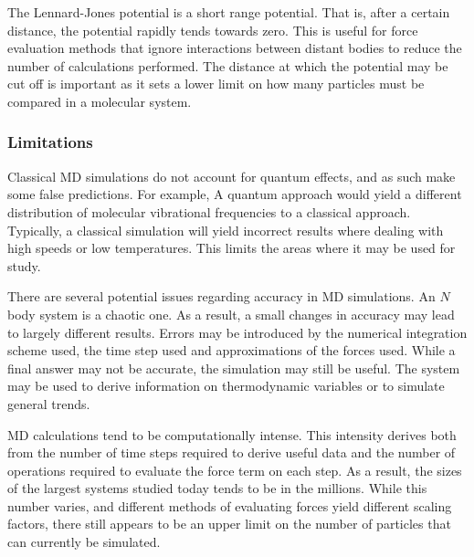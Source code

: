 The Lennard-Jones potential is a short range potential.
%
That is, after a certain distance,
the potential rapidly tends towards zero.
%
This is useful for force evaluation methods that
ignore interactions between distant bodies to
reduce the number of calculations performed.
%
The distance at which the potential may be cut off is important
as it sets a lower limit on how many
particles must be compared in a molecular system.


\subsubsection{Limitations}

Classical MD simulations do not account for quantum effects,
and as such make some false predictions.
%
For example, A quantum approach would yield
a different distribution of
molecular vibrational frequencies to a classical approach.
%
Typically, a classical simulation will yield incorrect results
where dealing with high speeds or low temperatures.
%
This limits the areas where it may be used for study.

There are several potential issues regarding accuracy in MD simulations.
%
An $N$ body system is a chaotic one.
%
As a result, a small changes in accuracy may lead to
largely different results.
%
Errors may be introduced by
the numerical integration scheme used,
the time step used and
approximations of the forces used.
%
While a final answer may not be accurate,
the simulation may still be useful.
%
The system may be used to derive information on
thermodynamic variables or to simulate general trends.


MD calculations tend to be computationally intense.
%
This intensity derives both from
the number of time steps required to derive useful data and
the number of operations required to evaluate the force term on each step.
%
As a result, the sizes of the largest systems studied today
tends to be in the millions.
%
While this number varies,
and different methods of evaluating forces yield
different scaling factors,
there still appears to be an upper limit on
the number of particles that can currently be simulated.
